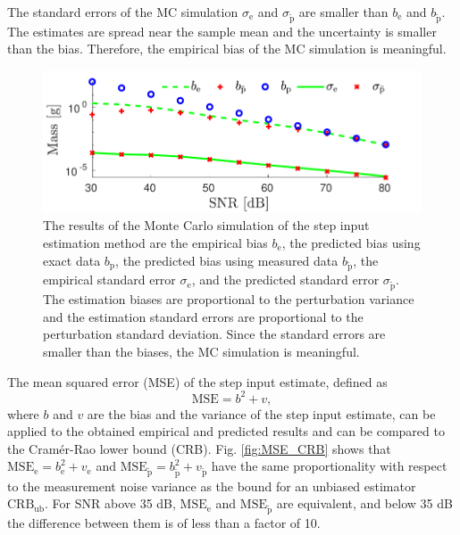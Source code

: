 The standard errors of the MC simulation $\sigma_\mathrm{e}$ and $\sigma_{\widetilde{\mathrm{p}}}$ are smaller than  $b_\mathrm{e}$ and $b_{\widetilde{\mathrm{p}}}$.
The estimates are spread near the sample mean and the uncertainty is smaller than the bias. 
Therefore, the empirical bias of the MC simulation is meaningful.

\begin{figure}[!htb]
\centering
\includegraphics[width=1.0\columnwidth]{./ChapterExperimentalValidation/fig/Fig_2.pdf} 
\caption{ \label{bias_sigma_sim_unstr_str_n2} 
The results of the Monte Carlo simulation of the step input estimation method are the empirical bias $b_{\mathrm{e}}$, the predicted bias using exact data $b_{\mathrm{p}}$, the predicted bias using measured data $b_{\widetilde{\mathrm{p}}}$, the empirical standard error $\sigma_{\mathrm{e}}$, and the predicted standard error $\sigma_{\widetilde{\mathrm{p}}}$. The estimation biases are proportional to the perturbation variance and the estimation standard errors are proportional to the perturbation standard deviation. Since the standard errors are smaller than the biases, the MC simulation is meaningful.  }
\end{figure}

The mean squared error (MSE) of the step input estimate, defined as
\begin{equation} \mathrm{MSE} = b^2 + v,   \end{equation}
where $b$ and $v$ are the bias and the variance of the step input estimate, can be applied to the obtained empirical and predicted results and can be compared to the Cram\'er-Rao lower bound (CRB).
Fig. \ref{fig:MSE_CRB} shows that $\mathrm{MSE}_\mathrm{e} = b_\mathrm{e}^2 + v_\mathrm{e}$ and $\mathrm{MSE}_{\widetilde{\mathrm{p}}}  = b_{\widetilde{\mathrm{p}}}^2 + v_{\widetilde{\mathrm{p}}}$ have the same proportionality with respect to the measurement noise variance as the bound for an unbiased estimator $\mathrm{CRB_{ub}}$.
For SNR above 35 dB, $\mathrm{MSE}_\mathrm{e}$ and $\mathrm{MSE}_{\widetilde{\mathrm{p}}}$ are equivalent, and below 35 dB the difference between them is of less than a factor of 10.


